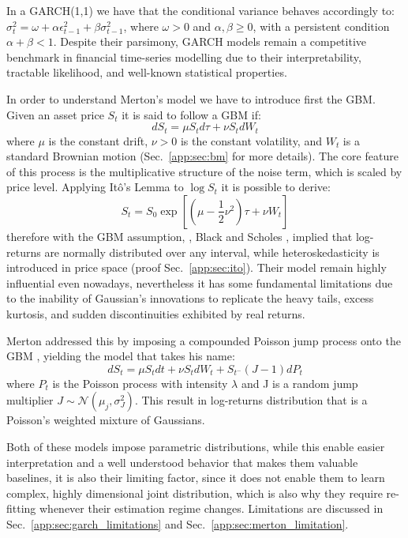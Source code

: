 In a GARCH(1,1) we have that the conditional variance behaves accordingly to: \(\sigma_t^2=\omega+\alpha\epsilon_{t-1}^2+\beta \sigma_{t-1}^2\), where \(\omega>0\) and \(\alpha, \beta \ge 0\), with a persistent condition \(\alpha+\beta<1\). Despite their parsimony, GARCH models remain a competitive benchmark in financial time-series modelling due to their interpretability, tractable likelihood, and well-known statistical properties. 

In order to understand Merton's model we have to introduce first the GBM. Given an asset price \(S_t\) it is said to follow a GBM if:
\begin{equation}
    \label{eq:blackscholes}
    dS_t=\mu S_td\tau+\nu S_tdW_t
\end{equation}
where \(\mu\) is the constant drift, \(\nu>0\) is the constant volatility, and \(W_t\) is a standard Brownian motion (Sec.\ \ref{app:sec:bm} for more details). The core feature of this process is the multiplicative structure of the noise term, which is scaled by price level. Applying Itô's Lemma to \(\log S_t\) it is possible to derive:
$$S_t=S_0\exp{\left[\left(\mu-\frac12\nu^2\right)\tau+\nu W_t\right]}$$
therefore with the GBM assumption, , Black and Scholes \cite{black1973pricing}, implied that log-returns are normally distributed over any interval, while heteroskedasticity is introduced in price space (proof Sec.\ \ref{app:sec:ito}). Their model remain highly influential even nowadays, nevertheless it has some fundamental limitations due to the inability of Gaussian's innovations to replicate the heavy tails, excess kurtosis, and sudden discontinuities exhibited by real returns. 

Merton addressed this by imposing a compounded Poisson jump process onto the GBM \cite{merton1976option}, yielding the model that takes his name:
$$dS_t=\mu S_tdt+\nu S_tdW_t+S_{t^-}(J-1)dP_t$$
where \(P_t\) is the Poisson process with intensity \(\lambda\) and J is a random jump multiplier \(J\sim \mathcal{N}(\mu_j, \sigma_J^2)\). This result in log-returns distribution that is a Poisson's weighted mixture of Gaussians. 

Both of these models impose parametric distributions, while this enable easier interpretation and a well understood behavior that makes them valuable baselines, it is also their limiting factor, since it does not enable them to learn complex, highly dimensional joint distribution, which is also why they require re-fitting whenever their estimation regime changes. Limitations are discussed in Sec.\ \ref{app:sec:garch_limitations} and Sec.\ \ref{app:sec:merton_limitation}.

